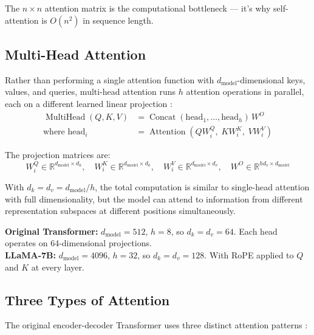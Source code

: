 \documentclass[11pt,a4paper]{article}
\newcommand{\R}{\mathbb{R}}
\newcommand{\Attention}{\operatorname{Attention}}
\newcommand{\MultiHead}{\operatorname{MultiHead}}
\newcommand{\Concat}{\operatorname{Concat}}
\newcommand{\dmodel}{d_{\text{model}}}
\newcommand{\dk}{d_k}
\newcommand{\dv}{d_v}
\begin{document}
The $n \times n$ attention matrix is the computational bottleneck --- it's why
self-attention is $O(n^2)$ in sequence length.

\subsection{Multi-Head Attention}

Rather than performing a single attention function with $\dmodel$-dimensional keys,
values, and queries, multi-head attention runs $h$ attention operations in parallel, each
on a different learned linear projection \cite{vaswani2017}:
\begin{align}
  \MultiHead(Q, K, V) &= \Concat(\text{head}_1, \ldots, \text{head}_h) \, W^O \\
  \text{where } \text{head}_i &= \Attention(Q W_i^Q, \; K W_i^K, \; V W_i^V)
\end{align}

The projection matrices are:
\begin{equation}
  W_i^Q \in \R^{\dmodel \times \dk}, \quad
  W_i^K \in \R^{\dmodel \times \dk}, \quad
  W_i^V \in \R^{\dmodel \times \dv}, \quad
  W^O \in \R^{h\dv \times \dmodel}
\end{equation}

With $\dk = \dv = \dmodel / h$, the total computation is similar to single-head attention
with full dimensionality, but the model can attend to information from different
representation subspaces at different positions simultaneously.

\begin{dimbox}
\textbf{Original Transformer:} $\dmodel = 512$, $h = 8$, so $\dk = \dv = 64$. Each head
operates on 64-dimensional projections.\\[4pt]
\textbf{LLaMA-7B:} $\dmodel = 4096$, $h = 32$, so $\dk = \dv = 128$. With RoPE applied
to $Q$ and $K$ at every layer.
\end{dimbox}

\subsection{Three Types of Attention}
\label{sec:attention-types}

The original encoder-decoder Transformer uses three distinct attention patterns
\cite{vaswani2017}:
\end{document}
